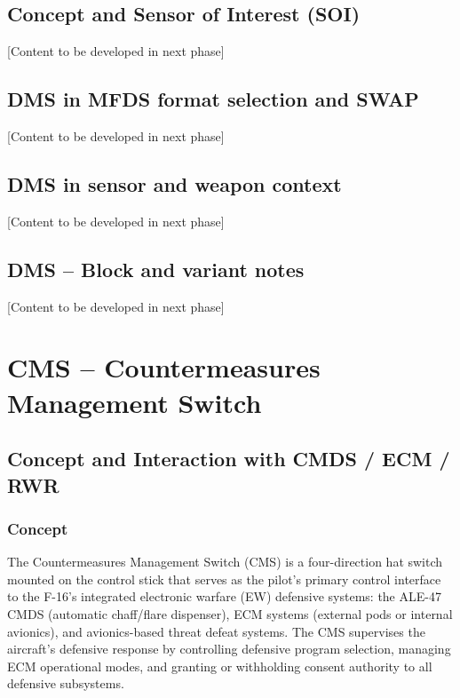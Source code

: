 \documentclass[11pt,a4paper]{article}
\begin{document}
\subsection{Concept and Sensor of Interest (SOI)}

[Content to be developed in next phase]

\subsection{DMS in MFDS format selection and SWAP}

[Content to be developed in next phase]

\subsection{DMS in sensor and weapon context}

[Content to be developed in next phase]

\subsection{DMS -- Block and variant notes}

[Content to be developed in next phase]

\section{CMS -- Countermeasures Management Switch}

\subsection{Concept and Interaction with CMDS / ECM / RWR}

\subsubsection{Concept}

The Countermeasures Management Switch (CMS) is a four-direction hat switch mounted on the control stick that serves as the pilot's primary control interface to the F-16's integrated electronic warfare (EW) defensive systems: the ALE-47 CMDS (automatic chaff/flare dispenser), ECM systems (external pods or internal avionics), and avionics-based threat defeat systems. The CMS supervises the aircraft's defensive response by controlling defensive program selection, managing ECM operational modes, and granting or withholding consent authority to all defensive subsystems.
\end{document}
